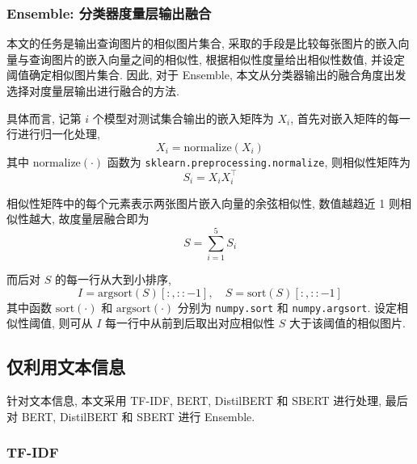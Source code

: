 \documentclass[12pt]{article}
\begin{document}
\subsubsection{Ensemble: 分类器度量层输出融合}

本文的任务是输出查询图片的相似图片集合, 采取的手段是比较每张图片的嵌入向量与查询图片的嵌入向量之间的相似性, 根据相似性度量给出相似性数值, 并设定阈值确定相似图片集合. 因此, 对于 Ensemble, 本文从分类器输出的融合角度出发选择对度量层输出进行融合的方法.

具体而言, 记第 $i$ 个模型对测试集合输出的嵌入矩阵为 $X_i$, 首先对嵌入矩阵的每一行进行归一化处理, 
\begin{equation}
  X_i = \text{normalize}(X_i)
\end{equation}
其中 $\text{normalize}(\cdot)$ 函数为 \verb|sklearn.preprocessing.normalize|, 则相似性矩阵为
\begin{equation}
  S_i = X_iX_i^\top
\end{equation}

相似性矩阵中的每个元素表示两张图片嵌入向量的余弦相似性, 数值越趋近 1 则相似性越大, 故度量层融合即为
\begin{equation}
  S = \sum_{i=1}^5S_i
\end{equation}

而后对 $S$ 的每一行从大到小排序, 
\begin{equation}
  I=\text{argsort}(S)[:,::-1],\quad S = \text{sort}(S)[:,::-1]
\end{equation}
其中函数 $\text{sort}(\cdot)$ 和 $\text{argsort}(\cdot)$ 分别为 \verb|numpy.sort| 和 \verb|numpy.argsort|. 设定相似性阈值, 则可从 $I$ 每一行中从前到后取出对应相似性 $S$ 大于该阈值的相似图片.

\subsection{仅利用文本信息}




针对文本信息, 本文采用 TF-IDF, BERT, DistilBERT 和 SBERT 进行处理, 最后对 BERT, DistilBERT 和 SBERT 进行 Ensemble.

\subsubsection{TF-IDF}
\end{document}
